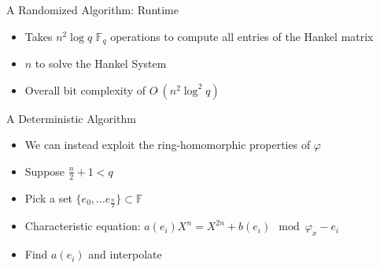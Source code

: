 \documentclass{beamer}
\newcommand{\f}{\mathbb{F}}
\begin{document}

\begin{frame}{A Randomized Algorithm: Runtime}
    \begin{itemize}
        \item Takes $n^2 \log q$ $\f_q$ operations to compute all entries of the Hankel matrix
    \item $n$ to solve the Hankel System
    \item Overall bit complexity of $O\tilde{~}(n^2 \log^2 q)$
    \end{itemize}
\end{frame}


\begin{frame}{A Deterministic Algorithm}

\begin{itemize}
    \item We can instead exploit the ring-homomorphic properties of $\varphi$
    \item Suppose $ \frac{n}{2} + 1 < q$
    \item Pick a set $\{e_0, \ldots e_{\frac{n}{2}}\} \subset \mathbb{F}$
    \item Characteristic equation: $a(e_i) X^n  = X^{2n} + b(e_i) \mod \varphi_{x} - e_i $
    \item Find $a(e_i)$ and interpolate
\end{itemize}
    
\end{frame}


\end{document}
